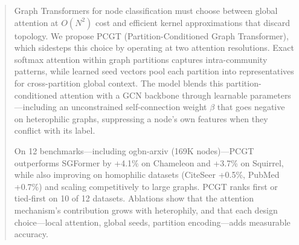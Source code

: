 \begin{abstract}

Graph Transformers for node classification must choose between global attention at $O(N^2)$ cost and efficient kernel approximations that discard topology. We propose PCGT (Partition-Conditioned Graph Transformer), which sidesteps this choice by operating at two attention resolutions. Exact softmax attention within graph partitions captures intra-community patterns, while learned seed vectors pool each partition into representatives for cross-partition global context. The model blends this partition-conditioned attention with a GCN backbone through learnable parameters---including an unconstrained self-connection weight $\beta$ that goes negative on heterophilic graphs, suppressing a node's own features when they conflict with its label.

On 12 benchmarks---including ogbn-arxiv (169K nodes)---PCGT outperforms SGFormer by +4.1\% on Chameleon and +3.7\% on Squirrel, while also improving on homophilic datasets (CiteSeer +0.5\%, PubMed +0.7\%) and scaling competitively to large graphs. PCGT ranks first or tied-first on 10 of 12 datasets. Ablations show that the attention mechanism's contribution grows with heterophily, and that each design choice---local attention, global seeds, partition encoding---adds measurable accuracy.

\end{abstract}
